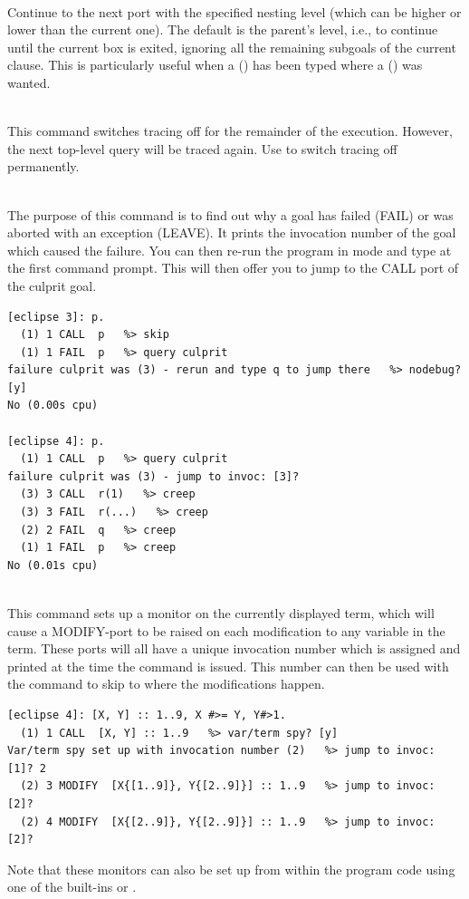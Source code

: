 \begin{descr}{1cm}
\\
Continue to the next port with the specified nesting level (which can
be higher or lower than the current one).
The default is the parent's level, i.e., to continue until the current
box is exited, ignoring all the remaining subgoals of the current clause.
This is particularly useful when a  () has been
typed where a  () was wanted.

\\
This command switches tracing off for the remainder of the execution.
However, the next top-level query will be traced again.
Use  to switch tracing off permanently.

\\
The purpose of this command is to find out why a goal has failed (FAIL)
or was aborted with an exception (LEAVE).  It prints the invocation
number of the goal which caused the failure.  You can then re-run the
program in  mode and type  at the first command
  prompt.  This will
then offer you to jump to the CALL port of the culprit goal.
\begin{verbatim}
[eclipse 3]: p.
  (1) 1 CALL  p   %> skip
  (1) 1 FAIL  p   %> query culprit
failure culprit was (3) - rerun and type q to jump there   %> nodebug? [y]
No (0.00s cpu)

[eclipse 4]: p.
  (1) 1 CALL  p   %> query culprit
failure culprit was (3) - jump to invoc: [3]?
  (3) 3 CALL  r(1)   %> creep
  (3) 3 FAIL  r(...)   %> creep
  (2) 2 FAIL  q   %> creep
  (1) 1 FAIL  p   %> creep
No (0.01s cpu)
\end{verbatim}

\\
This command sets up a monitor on the currently displayed term,
which will cause a MODIFY-port to be raised on each modification to
any variable in the term. These ports will all have a unique invocation
number which is assigned and printed at the time the command is issued.
This number can then be used with the  command to skip to where
the modifications happen.
\begin{verbatim}
[eclipse 4]: [X, Y] :: 1..9, X #>= Y, Y#>1.
  (1) 1 CALL  [X, Y] :: 1..9   %> var/term spy? [y]
Var/term spy set up with invocation number (2)   %> jump to invoc: [1]? 2
  (2) 3 MODIFY  [X{[1..9]}, Y{[2..9]}] :: 1..9   %> jump to invoc: [2]?
  (2) 4 MODIFY  [X{[2..9]}, Y{[2..9]}] :: 1..9   %> jump to invoc: [2]?
\end{verbatim}
Note that these monitors can also be set
up from within the program code using one of the built-ins
 or
.


\end{descr}
